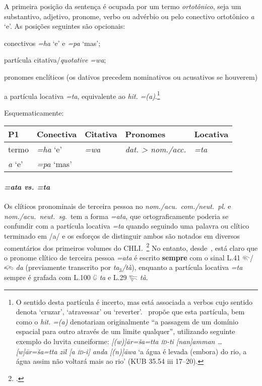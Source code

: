 A primeira posição da sentença é ocupada por um termo \emph{ortotônico},
seja um substantivo, adjetivo, pronome, verbo ou advérbio ou pelo conectivo
ortotônico \emph{a} `e'.
As posições seguintes são opcionais:
\begin{inparaenum}
	\item[2.] conectivos \emph{=ha} `e' e \emph{=pa} `mas';
	\item[3.] partícula citativa\slash{}\emph{quotative} \emph{=wa};
	\item[4.] pronomes enclíticos (os dativos precedem nominativos ou acusativos
	se houverem)
	\item[5.] a partícula locativa \emph{=ta}, equivalente ao \emph{hit.}
	\emph{={(a)}}.\footnote{O sentido desta partícula é
	incerto, mas está associada a verbos cujo sentido denota `cruzar',
	`atravessar' ou `reverter'.~\citet[419]{Josephson1972} propõe que esta partícula,
	bem como o \emph{hit.} \emph{={(a)}} denotariam originalmente
	``a passagem de um domínio espacial para outro através de um limite
	qualquer'', utilizando seguinte exemplo do luvita cuneiforme:
	\emph{[(w)]ār=ša=tta \textsc{íd}-ti [nan]amman \ldots{} [w]ār=ša=tta zīl [a
	\textsc{íd}-i] anda [(n)]āwa} `a água é levada (embora) do rio, a água assim
	não voltará mais ao rio' (KUB 35.54 iii 17–20).
	}
\end{inparaenum}

Esquematicamente:

\begin{center}
	\begin{tabular}[c]{lllll}
		\toprule
		P1\emph{}    & Conectiva\emph{} & Citativa\emph{} & Pronomes\emph{}         & Locativa\emph{} \\
		\midrule
		\emph{}termo & \emph{=ha} `e'   & \emph{=wa}      & \emph{dat. > nom./acc.} & \emph{=ta}      \\
		\emph{a} `e' & \emph{=pa} `mas' & \emph{}         & \emph{}                 & \emph{}         \\
		\bottomrule
	\end{tabular}
\end{center}

\paragraph{\emph{=ata vs. =ta}}
Os clíticos pronominais de terceira pessoa no \emph{nom.\slash{}acu.\
	com.\slash{}neut.\ pl.} e \emph{nom.\slash{}acu.\ neut.\ sg.}\ tem a forma
\emph{=ata}, que ortograficamente poderia se confundir com a partícula locativa
\emph{=ta} quando seguindo uma palavra ou clítico terminado em /a/ e
os esforços de distinguir ambos são notados em diversos comentários dos
primeiros volumes do CHLI.~\footnote{\citet{CHLI11,CHLI12,CHLI13,CHLI2}.}
No entanto, desde~\citet{Rieken2008}, está claro que o pronome clítico de
terceira pessoa \emph{=ata} é escrito \textbf{sempre} com o sinal L.41
𔐬\slash{}𔐫 \emph{da} (previamente transcrito por \emph{ta$_3$\slash{}tà}),
enquanto a partícula locativa \emph{=ta} sempre é grafada com L.100 𔑰 \emph{ta} e
L.29 𔐞 \emph{tà}.


